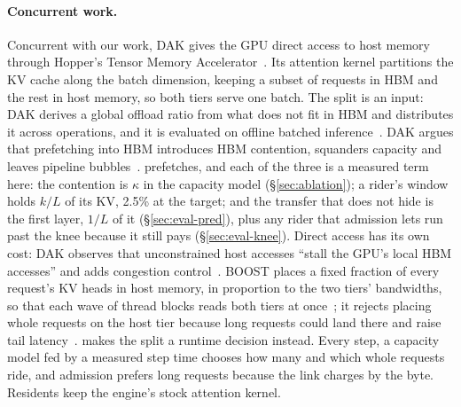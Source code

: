 \paragraph{Concurrent work.} Concurrent with our work, DAK gives the GPU
direct access to host memory through Hopper's Tensor Memory
Accelerator~\cite{dak}. Its attention kernel partitions the KV cache along
the batch dimension, keeping a subset of requests in HBM and the rest in host
memory, so both tiers serve one batch. The split is an input: DAK derives a
global offload ratio from what does not fit in HBM and distributes it across
operations, and it is evaluated on offline batched inference~\cite{dak}.
DAK argues that prefetching into HBM introduces HBM contention, squanders
capacity and leaves pipeline bubbles~\cite{dak}. \sysname{} prefetches, and
each of the three is a measured term here: the contention is $\kappa$ in the
capacity model (\S\ref{sec:ablation}); a rider's window holds $k/L$ of its KV,
2.5\% at the target; and the transfer that does not hide is the first layer,
$1/L$ of it (\S\ref{sec:eval-pred}), plus any rider that admission lets run
past the knee because it still pays (\S\ref{sec:eval-knee}). Direct access has its own cost: DAK
observes that unconstrained host accesses ``stall the GPU's local HBM
accesses'' and adds congestion control~\cite{dak}.
BOOST places a fixed fraction of every request's KV heads in host memory, in
proportion to the two tiers' bandwidths, so that each wave of thread blocks
reads both tiers at once~\cite{boost}; it rejects placing whole requests on
the host tier because long requests could land there and raise tail
latency~\cite{boost}. \sysname{} makes the split a runtime decision instead.
Every step, a capacity model fed by a measured step time chooses how many and
which whole requests ride, and admission prefers long requests because the
link charges by the byte. Residents keep the engine's stock attention kernel.
